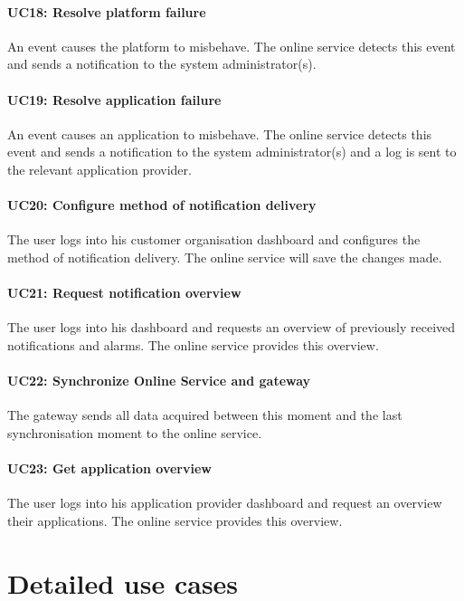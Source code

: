 \documentclass[english]{sareport}
\begin{document}
\paragraph{UC18: Resolve platform failure}
An event causes the platform to misbehave. The online service detects this event and sends a notification to the system administrator(s).

\paragraph{UC19: Resolve application failure}
An event causes an application to misbehave. The online service detects this event and sends a notification to the system administrator(s) and a log is sent to the relevant application provider.

\paragraph{UC20: Configure method of notification delivery}
The user logs into his customer organisation dashboard and configures the method of notification delivery. The online service will save the changes made.

\paragraph{UC21: Request notification overview}
The user logs into his dashboard and requests an overview of previously received notifications and alarms. The online service provides this overview.

\paragraph{UC22: Synchronize Online Service and gateway}
The gateway sends all data acquired between this moment and the last synchronisation moment to the online service.

\paragraph{UC23: Get application overview}
The user logs into his application provider dashboard and request an overview their applications. The online service provides this overview.


\section{Detailed use cases}
\end{document}
